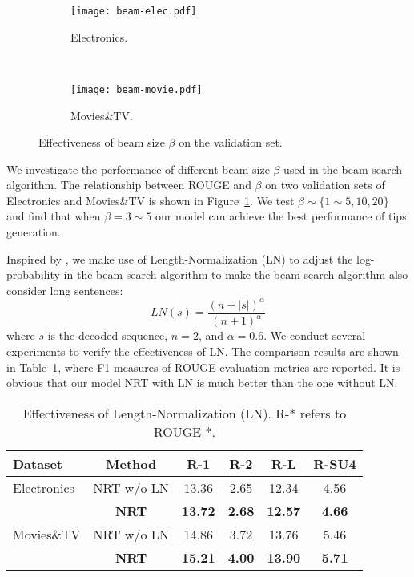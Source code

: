 \documentclass[sigconf]{acmart}
\begin{document}
\begin{figure}[!t]
	\centering
	\begin{subfigure}[t]{0.5\columnwidth}
		\centering
		\texttt{[image: beam-elec.pdf]}
		\caption{Electronics.}
	\end{subfigure}%
	~
	\begin{subfigure}[t]{0.5\columnwidth}
		\centering
		\texttt{[image: beam-movie.pdf]}
		\caption{Movies\&TV. }
	\end{subfigure}
	\caption{Effectiveness of beam size $\beta$ on the validation set.}
	\label{fig:tune_beam}
	\vspace{0mm}
\end{figure}

We investigate the performance of different beam size $\beta$ used in the beam search algorithm.
The relationship between ROUGE and $\beta$ on two validation sets of Electronics and Movies\&TV is shown in Figure~\ref{fig:tune_beam}.
We test $\beta \sim \{1\sim5, 10, 20\}$ and find that when $\beta = 3\sim5$ our model can achieve the best performance of tips generation.


Inspired by \cite{wu2016google}, we make use of Length-Normalization (LN) to adjust the  log-probability in the beam search algorithm to make the beam search algorithm also consider long sentences:
\begin{equation}
LN(s) = \frac{{{{(n + |s|)}^\alpha }}}{{{{(n + 1)}^\alpha }}}
\end{equation}
where $s$ is the decoded sequence, $n = 2$, and $\alpha = 0.6$.
We conduct several experiments to verify the effectiveness of LN.
The comparison results are shown in Table~\ref{tbl:rouge-ln}, where F1-measures of ROUGE evaluation metrics are reported.
It is obvious that our model NRT with LN is much better than the one without LN.


\begin{table}[!t]
	\centering
	\caption{Effectiveness of Length-Normalization (LN). R-* refers to ROUGE-*.}
	\label{tbl:rouge-ln}
	\begin{tabular}{l c c c c c}
		\hline
		\textbf{Dataset} & \textbf{Method} & \textbf{R-1} & \textbf{R-2} & \textbf{R-L} & \textbf{R-SU4} \\
		\hline
		Electronics	& NRT w/o LN       & 13.36 & 2.65 & 12.34 & 4.56 \\
		& \textbf{NRT}     & \textbf{13.72} & \textbf{2.68} & \textbf{12.57} & \textbf{4.66} \\
		\hline
		Movies\&TV	& NRT w/o LN        & 14.86 & 3.72 & 13.76 & 5.46 \\
		& \textbf{NRT}     & \textbf{15.21} & \textbf{4.00} & \textbf{13.90} & \textbf{5.71} \\
		\hline
	\end{tabular}
	\vspace{0mm}
\end{table}
\end{document}
